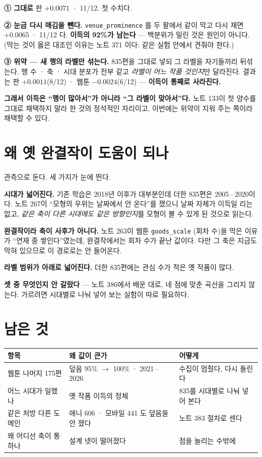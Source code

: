 \documentclass[11pt]{article}
\begin{document}
\textbf{① 그대로} 판 $+0.0071$ · 11/12. 첫 수치다.

\textbf{② 눈금 다시 매김을 뺀다.} \texttt{venue\_prominence} 를 두 팔에서
같이 막고 다시 재면 $+0.0065$ · 11/12 다. \textbf{이득의 92\%가 남는다}
--- 백분위가 밀린 것은 원인이 아니다. (막는 것이 옳은 대조인 이유는 노트
371 이다: 같은 실험 안에서 견줘야 한다.)

\textbf{③ 위약 --- 새 행의 라벨만 섞는다.} 835편을 그대로 넣되 그 라벨을
자기들끼리 뒤섞는다. 행 수 · 축 · 시대 분포가 전부 같고 \emph{라벨이
어느 작품 것인지}만 달라진다. 결과는 판 $+0.0011$(8/12) · 웹툰
$\mathbf{-0.0024}$(6/12) --- \textbf{이득이 통째로 사라진다.}

\textbf{그래서 이득은 ``행이 많아서''가 아니라 ``그 라벨이 맞아서''다.}
노트 133이 첫 양수를 그대로 채택하지 말라 한 것의 정석적인 자리이고,
이번에는 위약이 지워 주는 쪽이라 채택할 수 있다.

\section{왜 옛 완결작이 도움이 되나}

관측으로 둔다. 세 가지가 눈에 띈다.

\textbf{시대가 넓어진다.} 기존 학습은 2018년 이후가 대부분인데 더한 835편은
2005\,--\,2020이다. 노트 267이 ``모형의 우위는 날짜에서 안 온다''를 쟀으니
날짜 자체가 이득일 리는 없고, \emph{같은 축이 다른 시대에도 같은 방향인지}를
모형이 볼 수 있게 된 것으로 읽는다.

\textbf{완결작이라 축이 사후가 아니다.} 노트 263이 웹툰 \texttt{goods\_scale}
(회차 수)을 막은 이유가 ``연재 중 쌓인다''였는데, 완결작에서는 회차 수가
끝난 값이다. 다만 그 축은 지금도 막혀 있으므로 이 경로로는 안 들어온다.

\textbf{라벨 범위가 아래로 넓어진다.} 더한 835편에는 관심 수가 적은 옛
작품이 많다.

\textbf{셋 중 무엇인지 안 갈랐다} --- 노트 386에서 배운 대로, 네 점에 맞춘
곡선을 그리지 않는다. 가르려면 시대별로 나눠 넣어 보는 실험이 따로 필요하다.

\section{남은 것}

\begin{center}
\begin{tabular}{lll}
\hline
항목 & 왜 값이 큰가 & 어떻게 \\
\hline
웹툰 나머지 175편 & 덮음 95\% $\to$ 100\% · 2021\,--\,2026 & 수집이 멈췄다, 다시 돌린다 \\
어느 시대가 일했나 & 옛 작품 이득의 정체 & 835를 시대별로 나눠 넣어 본다 \\
같은 처방 다른 도메인 & 애니 606 · 모바일 441 도 덮음을 안 쟀다 & 노트 383 절차로 센다 \\
왜 어디선 축이 통하나 & 설계 넷이 떨어졌다 & 점을 늘리는 수밖에 \\
\hline
\end{tabular}
\end{center}
\end{document}
